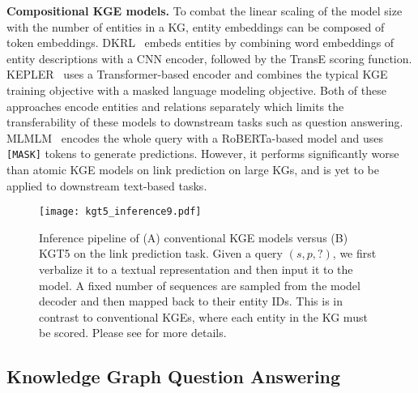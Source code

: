 \documentclass[11pt]{article}
\renewcommand\:{\colon} \newcommand{\sset}[1]{\left\{\,#1\,\right\}} \newcommand{\ssets}[1]{\left\{#1\right\}} \newcommand{\ssetn}[1]{\{\,#1\,\}}
\newcommand{\method}{\textsc{KGT5}}
\begin{document}
\noindent\textbf{Compositional KGE models.}
To combat the linear scaling of the model size with the number of entities in a KG, entity embeddings can be composed of token embeddings.
DKRL~\cite{xie2016representation} embeds entities by combining word embeddings of entity descriptions with a CNN encoder, followed by the TransE scoring function.
KEPLER~\cite{wang2021KEPLER} uses a Transformer-based encoder and combines the typical KGE training objective with a masked language modeling objective.
Both of these approaches encode entities and relations separately which limits the transferability of these models to downstream tasks such as question answering.
MLMLM~\cite{clouatre-etal-2021-mlmlm} encodes the whole query with a RoBERTa-based model and uses \texttt{[MASK]} tokens to generate predictions. However, it performs significantly worse than atomic KGE models on link prediction on large KGs, and is yet to be applied to downstream text-based tasks.



\begin{figure*}
  \centering
  \texttt{[image: kgt5\_inference9.pdf]}
  \caption{Inference pipeline of (A) conventional KGE models versus (B) \method{} on the link prediction task. Given a query $(s, p, ?)$, we first verbalize it to a textual representation and then input it to the model. A fixed number of sequences are sampled from the model decoder and then mapped back to their entity IDs. This is in contrast to conventional KGEs, where each entity in the KG must be scored. Please see  for more details.
} 
  \label{fig:kgt5-inference}
\end{figure*}



\subsection{Knowledge Graph Question Answering}
\label{sec:kgqa}
\end{document}
